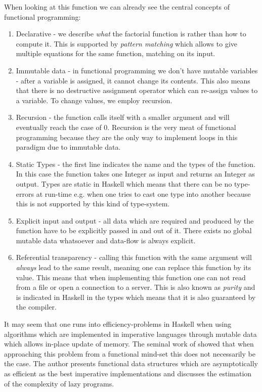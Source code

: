 When looking at this function we can already see the central concepts of functional programming: 
\begin{enumerate}
	\item Declarative - we describe \textit{what} the factorial function is rather than how to compute it. This is supported by \textit{pattern matching} which allows to give multiple equations for the same function, matching on its input. 
	\item Immutable data - in functional programming we don't have mutable variables - after a variable is assigned, it cannot change its contents. This also means that there is no destructive assignment operator which can re-assign values to a variable. To change values, we employ recursion.
	\item Recursion - the function calls itself with a smaller argument and will eventually reach the case of 0. Recursion is the very meat of functional programming because they are the only way to implement loops in this paradigm due to immutable data.
	\item Static Types - the first line indicates the name and the types of the function. In this case the function takes one Integer as input and returns an Integer as output. Types are static in Haskell which means that there can be no type-errors at run-time e.g. when one tries to cast one type into another because this is not supported by this kind of type-system.
	\item Explicit input and output - all data which are required and produced by the function have to be explicitly passed in and out of it. There exists no global mutable data whatsoever and data-flow is always explicit.
	\item Referential transparency - calling this function with the same argument will \textit{always} lead to the same result, meaning one can replace this function by its value. This means that when implementing this function one can not read from a file or open a connection to a server. This is also known as \textit{purity} and is indicated in Haskell in the types which means that it is also guaranteed by the compiler.
\end{enumerate}

It may seem that one runs into efficiency-problems in Haskell when using algorithms which are implemented in imperative languages through mutable data which allows in-place update of memory. The seminal work of \cite{okasaki_purely_1999} showed that when approaching this problem from a functional mind-set this does not necessarily be the case. The author presents functional data structures which are asymptotically as efficient as the best imperative implementations and discusses the estimation of the complexity of lazy programs.

